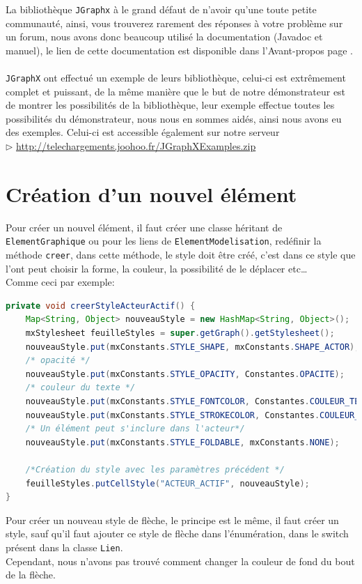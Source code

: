 \documentclass[12pt,a4paper,oneside]{book}
\begin{document}
	La bibliothèque \texttt{JGraphx} à le grand défaut de n'avoir qu'une toute petite communauté, ainsi, vous trouverez rarement des réponses à votre problème
	sur un forum, nous avons donc beaucoup utilisé la documentation (Javadoc et manuel), le lien de cette documentation est disponible dans l'Avant-propos page \pageref{docDemonstrateur}.

	\paragraph{}	
	\texttt{JGraphX} ont effectué un exemple de leurs bibliothèque, celui-ci est extrêmement complet et puissant, de la même manière que le but de notre démonstrateur est de montrer
	les possibilités de la bibliothèque, leur exemple effectue toutes les possibilités du démonstrateur, nous nous en sommes aidés, ainsi nous avons eu des exemples. 
	Celui-ci est accessible également sur notre serveur\\
	$\rhd$ \url{http://telechargements.joohoo.fr/JGraphXExamples.zip}\\ 

	\section{Création d'un nouvel élément}\label{style}
	Pour créer un nouvel élément, il faut créer une classe héritant de \texttt{ElementGraphique} ou pour les liens de \texttt{ElementModelisation}, redéfinir la méthode \texttt{creer}, dans cette méthode, le style doit être créé, c'est dans ce style que l'ont peut choisir la forme, la couleur, la possibilité de le déplacer etc\ldots \\
	Comme ceci par exemple:
	\begin{lstlisting}[language=Java, caption=Création du style de l'acteur actif]
private void creerStyleActeurActif() {
	Map<String, Object> nouveauStyle = new HashMap<String, Object>();
	mxStylesheet feuilleStyles = super.getGraph().getStylesheet();
	nouveauStyle.put(mxConstants.STYLE_SHAPE, mxConstants.SHAPE_ACTOR); 
	/* opacité */
	nouveauStyle.put(mxConstants.STYLE_OPACITY, Constantes.OPACITE);
	/* couleur du texte */
	nouveauStyle.put(mxConstants.STYLE_FONTCOLOR, Constantes.COULEUR_TEXTE); 
	nouveauStyle.put(mxConstants.STYLE_STROKECOLOR, Constantes.COULEUR_BORDURE); //Couleur de la bordure
	/* Un élément peut s'inclure dans l'acteur*/
	nouveauStyle.put(mxConstants.STYLE_FOLDABLE, mxConstants.NONE); 
	
	/*Création du style avec les paramètres précédent */
	feuilleStyles.putCellStyle("ACTEUR_ACTIF", nouveauStyle); 
}
\end{lstlisting}
Pour créer un nouveau style de flèche, le principe est le même, il faut créer un style, sauf qu'il faut ajouter ce style de flèche dans l'énumération, dans
le switch présent dans la classe \texttt{Lien}.\\
Cependant, nous n'avons pas trouvé comment changer la couleur de fond du bout de la flèche.
	
\end{document}
